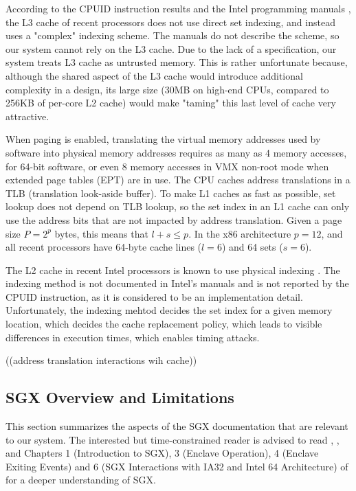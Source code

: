 According to the CPUID instruction results and the Intel programming manuals
\cite{intel2013manual}, the L3 cache of recent processors does not use direct
set indexing, and instead uses a "complex" indexing scheme. The manuals do not
describe the scheme, so our system cannot rely on the L3 cache. Due to the lack
of a specification, our system treats L3 cache as untrusted memory. This is
rather unfortunate because, although the shared aspect of the L3 cache would
introduce additional complexity in a design, its large size (30MB on high-end
CPUs, compared to 256KB of per-core L2 cache) would make "taming" this last
level of cache very attractive.

When paging is enabled, translating the virtual memory addresses used by
software into physical memory addresses requires as many as 4 memory accesses,
for 64-bit software, or even 8 memory accesses in VMX non-root mode when
extended page tables (EPT) are in use. The CPU caches address translations in a
TLB (translation look-aside buffer). To make L1 caches as fast as possible, set
lookup does not depend on TLB lookup, so the set index in an L1 cache can only
use the address bits that are not impacted by address translation. Given a page
size $P = 2^{p}$ bytes, this means that $l + s \le p$. In the x86 architecture
$p = 12$, and all recent processors have 64-byte cache lines ($l = 6$) and
64 sets ($s = 6$).

The L2 cache in recent Intel processors is known to use physical indexing
\cite{patterson2013architecture}. The indexing method is not documented in
Intel's manuals and is not reported by the CPUID instruction, as it is
considered to be an implementation detail. Unfortunately, the indexing mehtod
decides the set index for a given memory location, which decides the cache
replacement policy, which leads to visible differences in execution times,
which enables timing attacks.

((address translation interactions wih cache))


\subsection{SGX Overview and Limitations}
\label{sec:sgx}

This section summarizes the aspects of the SGX documentation that are relevant
to our system. The interested but time-constrained reader is advised to read
\cite{mckeen2013innovative}, \cite{anati2013sgx}, and Chapters 1 (Introduction
to SGX), 3 (Enclave Operation), 4 (Enclave Exiting Events) and 6 (SGX
Interactions with IA32 and Intel 64 Architecture) of \cite{intel2013sgxmanual}
for a deeper understanding of SGX.


